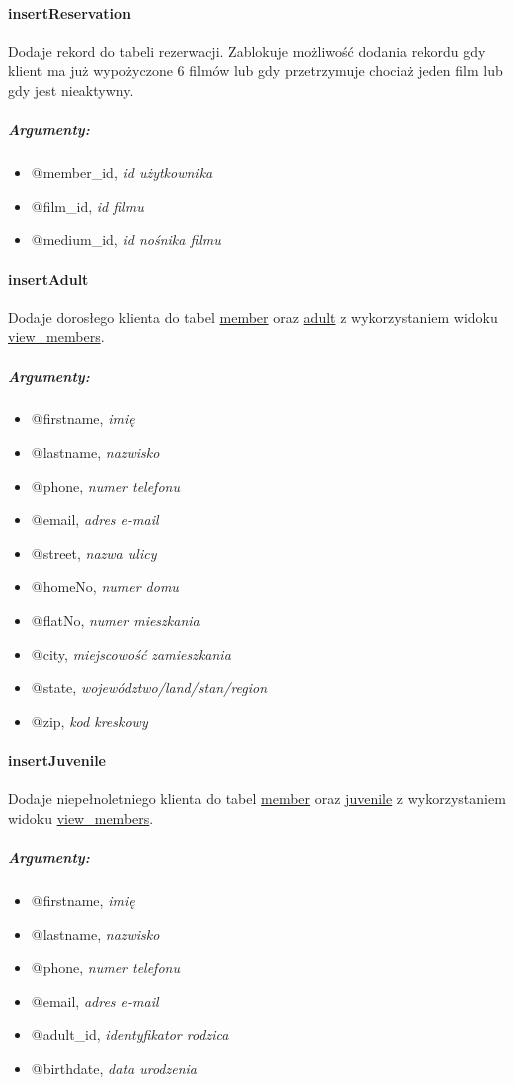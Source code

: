 \documentclass[12pt,a4paper,titlepage]{article}
\begin{document}
\paragraph{insertReservation}
Dodaje rekord do tabeli rezerwacji. Zablokuje możliwość dodania rekordu gdy klient ma już wypożyczone 6 filmów lub gdy przetrzymuje chociaż jeden film lub gdy jest nieaktywny.
\subparagraph{Argumenty:}
\begin{itemize}
	\item @member\_id, \textit{id użytkownika}
	\item @film\_id, \textit{id filmu}
	\item @medium\_id, \textit{id nośnika filmu}
\end{itemize}

\paragraph{insertAdult}
Dodaje dorosłego klienta do tabel \underline{member} oraz \underline{adult} z wykorzystaniem widoku \underline{view\_members}.
\subparagraph{Argumenty:}
\begin{itemize}
	\item @firstname, \textit{imię}
	\item @lastname, \textit{nazwisko}
	\item @phone, \textit{numer telefonu}
	\item @email, \textit{adres e-mail}
	\item @street, \textit{nazwa ulicy}
	\item @homeNo, \textit{numer domu}
	\item @flatNo, \textit{numer mieszkania}
	\item @city, \textit{miejscowość zamieszkania}
	\item @state, \textit{województwo/land/stan/region}
	\item @zip, \textit{kod kreskowy}
\end{itemize}
\newpage
\paragraph{insertJuvenile}
Dodaje niepełnoletniego klienta do tabel \underline{member} oraz \underline{juvenile} z wykorzystaniem widoku \underline{view\_members}.
\subparagraph{Argumenty:}
\begin{itemize}
	\item @firstname, \textit{imię}
	\item @lastname, \textit{nazwisko}
	\item @phone, \textit{numer telefonu}
	\item @email, \textit{adres e-mail}
	\item @adult\_id, \textit{identyfikator rodzica}
	\item @birthdate, \textit{data urodzenia}
\end{itemize}
\end{document}
